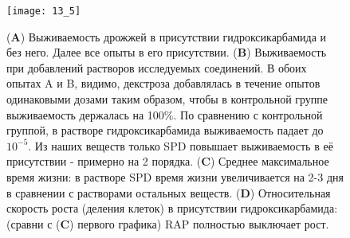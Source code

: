 \begin{figure}[H]
	\centering
		\texttt{[image: 13\_5]}
		\caption{(\textbf{A}) Выживаемость дрожжей в присутствии гидроксикарбамида и без него. Далее все опыты в его присутствии. (\textbf{B}) Выживаемость при добавлений растворов исследуемых соединений. В обоих опытах A и B, видимо, декстроза добавлялась в течение опытов одинаковыми дозами таким образом, чтобы в контрольной группе выживаемость держалась на 100$\%$. По сравнению с контрольной группой, в растворе гидроксикарбамида выживаемость падает до $10^{-5}$. Из наших веществ только SPD повышает выживаемость в её присутствии - примерно на 2 порядка. (\textbf{C}) Среднее максимальное время жизни: в растворе SPD время жизни увеличивается на 2-3 дня в сравнении с растворами остальных веществ. (\textbf{D}) Относительная скорость роста (деления клеток) в присутствии гидроксикарбамида: (сравни с (\textbf{C})  первого графика) RAP полностью выключает рост.}
\end{figure}